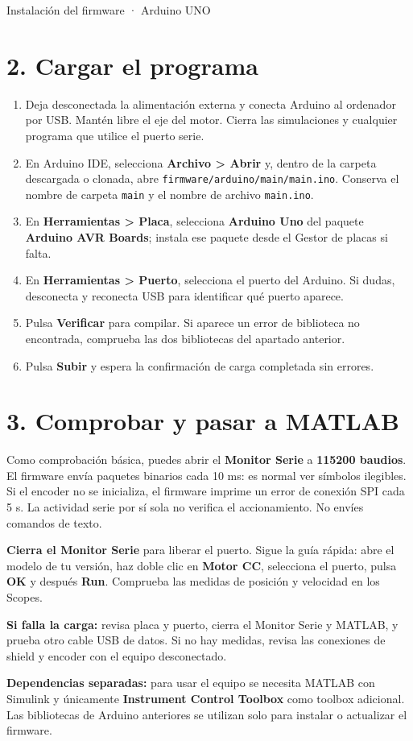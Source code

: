 \documentclass[11pt,a4paper]{article}
\begin{document}
\clearpage
{\small\color{isa} Instalación del firmware · Arduino UNO}\par
\section*{2. Cargar el programa}
\begin{enumerate}
\item Deja desconectada la alimentación externa y conecta Arduino al ordenador por USB. Mantén libre el eje del motor. Cierra las simulaciones y cualquier programa que utilice el puerto serie.
\item En Arduino IDE, selecciona \textbf{Archivo > Abrir} y, dentro de la carpeta descargada o clonada, abre \texttt{firmware/arduino/main/main.ino}. Conserva el nombre de carpeta \texttt{main} y el nombre de archivo \texttt{main.ino}.
\item En \textbf{Herramientas > Placa}, selecciona \textbf{Arduino Uno} del paquete \textbf{Arduino AVR Boards}; instala ese paquete desde el Gestor de placas si falta.
\item En \textbf{Herramientas > Puerto}, selecciona el puerto del Arduino. Si dudas, desconecta y reconecta USB para identificar qué puerto aparece.
\item Pulsa \textbf{Verificar} para compilar. Si aparece un error de biblioteca no encontrada, comprueba las dos bibliotecas del apartado anterior.
\item Pulsa \textbf{Subir} y espera la confirmación de carga completada sin errores.
\end{enumerate}

\section*{3. Comprobar y pasar a MATLAB}
Como comprobación básica, puedes abrir el \textbf{Monitor Serie} a \textbf{115200 baudios}. El firmware envía paquetes binarios cada 10 ms: es normal ver símbolos ilegibles. Si el encoder no se inicializa, el firmware imprime un error de conexión SPI cada 5 s. La actividad serie por sí sola no verifica el accionamiento. No envíes comandos de texto.

\textbf{Cierra el Monitor Serie} para liberar el puerto. Sigue la guía rápida: abre el modelo de tu versión, haz doble clic en \textbf{Motor CC}, selecciona el puerto, pulsa \textbf{OK} y después \textbf{Run}. Comprueba las medidas de posición y velocidad en los Scopes.

\textbf{Si falla la carga:} revisa placa y puerto, cierra el Monitor Serie y MATLAB, y prueba otro cable USB de datos. Si no hay medidas, revisa las conexiones de shield y encoder con el equipo desconectado.

\textbf{Dependencias separadas:} para usar el equipo se necesita MATLAB con Simulink y únicamente \textbf{Instrument Control Toolbox} como toolbox adicional. Las bibliotecas de Arduino anteriores se utilizan solo para instalar o actualizar el firmware.
\end{document}
